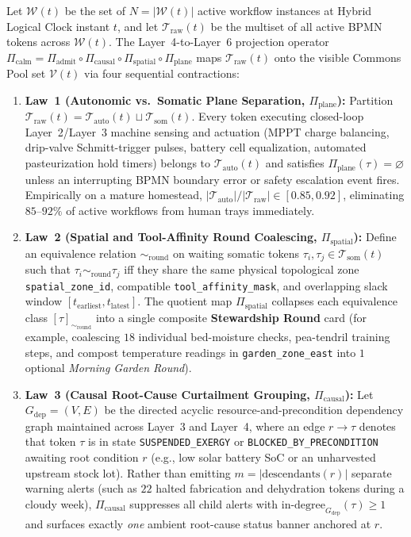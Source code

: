 \begin{definition}
\label{def:calm-attenuation}
Let $\mathcal{W}(t)$ be the set of $N = |\mathcal{W}(t)|$ active workflow instances at Hybrid Logical Clock instant $t$, and let $\mathcal{T}_{\text{raw}}(t)$ be the multiset of all active BPMN tokens across $\mathcal{W}(t)$. The Layer~4-to-Layer~6 projection operator $\Pi_{\text{calm}} = \Pi_{\text{admit}} \circ \Pi_{\text{causal}} \circ \Pi_{\text{spatial}} \circ \Pi_{\text{plane}}$ maps $\mathcal{T}_{\text{raw}}(t)$ onto the visible Commons Pool set $\mathcal{V}(t)$ via four sequential contractions:
\begin{enumerate}
  \item \textbf{Law~1 (Autonomic vs.\ Somatic Plane Separation, $\Pi_{\text{plane}}$):} Partition $\mathcal{T}_{\text{raw}}(t) = \mathcal{T}_{\text{auto}}(t) \sqcup \mathcal{T}_{\text{som}}(t)$. Every token executing closed-loop Layer~2/Layer~3 machine sensing and actuation (MPPT charge balancing, drip-valve Schmitt-trigger pulses, battery cell equalization, automated pasteurization hold timers) belongs to $\mathcal{T}_{\text{auto}}(t)$ and satisfies $\Pi_{\text{plane}}(\tau) = \varnothing$ unless an interrupting BPMN boundary error or safety escalation event fires. Empirically on a mature homestead, $|\mathcal{T}_{\text{auto}}| / |\mathcal{T}_{\text{raw}}| \in [0.85, 0.92]$, eliminating $85\text{--}92\%$ of active workflows from human trays immediately.
  \item \textbf{Law~2 (Spatial and Tool-Affinity Round Coalescing, $\Pi_{\text{spatial}}$):} Define an equivalence relation $\sim_{\text{round}}$ on waiting somatic tokens $\tau_i, \tau_j \in \mathcal{T}_{\text{som}}(t)$ such that $\tau_i \sim_{\text{round}} \tau_j$ iff they share the same physical topological zone \texttt{spatial\_zone\_id}, compatible \texttt{tool\_affinity\_mask}, and overlapping slack window $[t_{\text{earliest}}, t_{\text{latest}}]$. The quotient map $\Pi_{\text{spatial}}$ collapses each equivalence class $[\tau]_{\sim_{\text{round}}}$ into a single composite \textbf{Stewardship Round} card (for example, coalescing $18$ individual bed-moisture checks, pea-tendril training steps, and compost temperature readings in \texttt{garden\_zone\_east} into $1$ optional \emph{Morning Garden Round}).
  \item \textbf{Law~3 (Causal Root-Cause Curtailment Grouping, $\Pi_{\text{causal}}$):} Let $G_{\text{dep}} = (V, E)$ be the directed acyclic resource-and-precondition dependency graph maintained across Layer~3 and Layer~4, where an edge $r \to \tau$ denotes that token $\tau$ is in state \texttt{SUSPENDED\_EXERGY} or \texttt{BLOCKED\_BY\_PRECONDITION} awaiting root condition $r$ (e.g., low solar battery SoC or an unharvested upstream stock lot). Rather than emitting $m = |\text{descendants}(r)|$ separate warning alerts (such as $22$ halted fabrication and dehydration tokens during a cloudy week), $\Pi_{\text{causal}}$ suppresses all child alerts with $\text{in-degree}_{G_{\text{dep}}}(\tau) \ge 1$ and surfaces exactly \emph{one} ambient root-cause status banner anchored at $r$.

\end{enumerate}
\end{definition}
